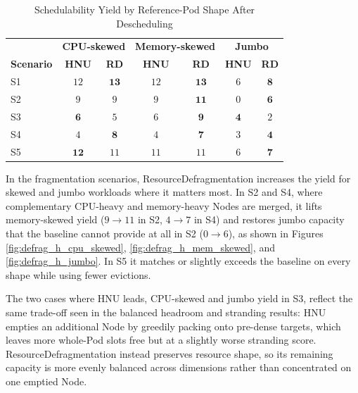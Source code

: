 \begin{table}[H]
    \centering
    \caption{Schedulability Yield by Reference-Pod Shape After Descheduling}
    \label{tab:defrag_shape_headroom}
    \renewcommand{\arraystretch}{1.2}
    \begin{tabular}{l cc cc cc}
        \hline
        & \multicolumn{2}{c}{\textbf{CPU-skewed}} & \multicolumn{2}{c}{\textbf{Memory-skewed}} & \multicolumn{2}{c}{\textbf{Jumbo}} \\
        \textbf{Scenario} & \textbf{HNU} & \textbf{RD} & \textbf{HNU} & \textbf{RD} & \textbf{HNU} & \textbf{RD} \\
        \hline
        S1 & \(12\) & \(\mathbf{13}\) & \(12\) & \(\mathbf{13}\) & \(6\) & \(\mathbf{8}\) \\
        S2 & \(9\)  & \(9\)          & \(9\)  & \(\mathbf{11}\) & \(0\) & \(\mathbf{6}\) \\
        S3 & \(\mathbf{6}\) & \(5\)   & \(6\)  & \(\mathbf{9}\)  & \(\mathbf{4}\) & \(2\) \\
        S4 & \(4\)  & \(\mathbf{8}\)  & \(4\)  & \(\mathbf{7}\)  & \(3\) & \(\mathbf{4}\) \\
        S5 & \(\mathbf{12}\) & \(11\) & \(11\) & \(11\)          & \(6\) & \(\mathbf{7}\) \\
        \hline
    \end{tabular}
\end{table}

In the fragmentation scenarios, ResourceDefragmentation increases the yield for skewed and jumbo workloads where it matters most. In S2 and S4, where complementary CPU-heavy and memory-heavy Nodes are merged, it lifts memory-skewed yield (\(9 \to 11\) in S2, \(4 \to 7\) in S4) and restores jumbo capacity that the baseline cannot provide at all in S2 (\(0 \to 6\)), as shown in Figures \ref{fig:defrag_h_cpu_skewed}, \ref{fig:defrag_h_mem_skewed}, and \ref{fig:defrag_h_jumbo}. In S5 it matches or slightly exceeds the baseline on every shape while using fewer evictions.

The two cases where HNU leads, CPU-skewed and jumbo yield in S3, reflect the same trade-off seen in the balanced headroom and stranding results: HNU empties an additional Node by greedily packing onto pre-dense targets, which leaves more whole-Pod slots free but at a slightly worse stranding score. ResourceDefragmentation instead preserves resource shape, so its remaining capacity is more evenly balanced across dimensions rather than concentrated on one emptied Node.

